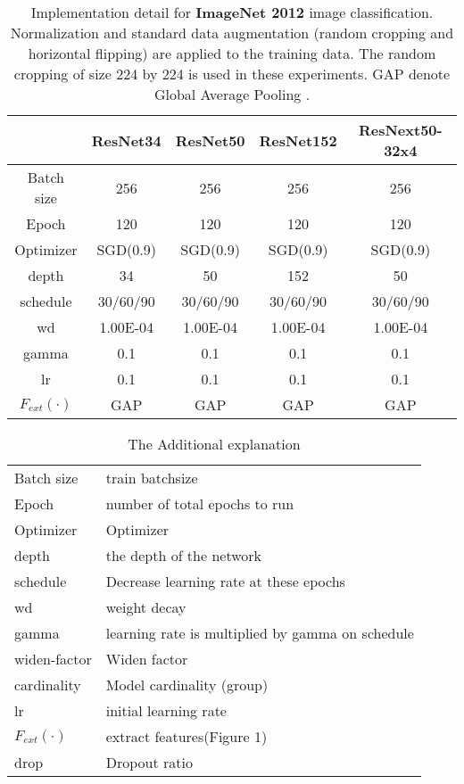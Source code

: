 \documentclass[letterpaper]{article} \usepackage{aaai20}  \usepackage{times}  \usepackage{helvet} \usepackage{courier}  \usepackage[hyphens]{url}  \usepackage{graphicx} \urlstyle{rm} \def\UrlFont{\rm}  \usepackage{graphicx}  \frenchspacing  \setlength{\pdfpagewidth}{8.5in}  \setlength{\pdfpageheight}{11in}  \usepackage{color}
\begin{document}
	\begin{table*}[htbp]
		
		\centering
		\begin{tabular}{|c|c|c|c|c|}
			\toprule
			& ResNet34 & ResNet50 & ResNet152 & ResNext50-32x4 \\
			\midrule
			Batch size & 256   & 256   & 256   & 256 \\
			Epoch & 120   & 120   & 120   & 120 \\
			Optimizer & SGD(0.9) & SGD(0.9) & SGD(0.9) & SGD(0.9) \\
			depth & 34    & 50    & 152   & 50 \\
			schedule & 30/60/90 & 30/60/90 & 30/60/90 & 30/60/90 \\
			wd    & 1.00E-04 & 1.00E-04 & 1.00E-04 & 1.00E-04 \\
			gamma & 0.1   & 0.1   & 0.1   & 0.1 \\
lr    & 0.1   & 0.1   & 0.1   & 0.1 \\
			$F_{ext}(\cdot)$ & GAP   & GAP   & GAP   & GAP \\
			\bottomrule
		\end{tabular}\caption{Implementation detail for \textbf{ImageNet 2012} image classification. Normalization and standard data augmentation (random cropping and horizontal flipping) are applied to the training data. The random cropping of size 224 by 224 is used in these experiments. GAP denote Global Average Pooling .}
		\vspace{-0.18cm}
			\label{tab:imagenet}\end{table*}

	\begin{table*}[htbp]
		\small
		\centering
		\begin{tabular}{|l|l|}
			\toprule
			Batch size & train batchsize \\
			Epoch & number of total epochs to run \\
			Optimizer & Optimizer \\
			depth & the depth of the network \\
			schedule & Decrease learning rate at these epochs \\
			wd    & weight decay \\
			gamma & learning rate is multiplied by gamma on schedule \\
			widen-factor & Widen factor \\
			cardinality & Model cardinality (group) \\
			lr    & initial learning rate \\
			$F_{ext}(\cdot)$ &  extract features(Figure 1)\\
			drop  & Dropout ratio \\
			\bottomrule
		\end{tabular}\label{tab:addlabel}\caption{The Additional explanation}
		\vspace{-0.2cm}
	\end{table*}
\end{document}
